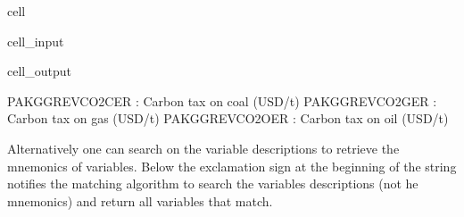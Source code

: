 \documentclass[letterpaper,10pt,english]{jupyterBook}
\begin{document}
\begin{sphinxuseclass}{cell}\begin{sphinxVerbatimInput}

\begin{sphinxuseclass}{cell_input}
\begin{sphinxVerbatim}[commandchars=\\\{\}]
\PYG{p}{[}\PYG{p}{]}
    
\end{sphinxVerbatim}

\end{sphinxuseclass}\end{sphinxVerbatimInput}
\begin{sphinxVerbatimOutput}

\begin{sphinxuseclass}{cell_output}
\begin{sphinxVerbatim}[commandchars=\\\{\}]
PAKGGREVCO2CER : Carbon tax on coal (USD/t)
PAKGGREVCO2GER : Carbon tax on gas (USD/t)
PAKGGREVCO2OER : Carbon tax on oil (USD/t)
\end{sphinxVerbatim}

\end{sphinxuseclass}\end{sphinxVerbatimOutput}

\end{sphinxuseclass}
\sphinxAtStartPar
Alternatively one can search on the variable descriptions to retrieve the mnemonics of variables. Below the exclamation sign at the beginning of the string notifies the matching algorithm to search the variables descriptions (not he mnemonics) and return all variables that match.
\end{document}
